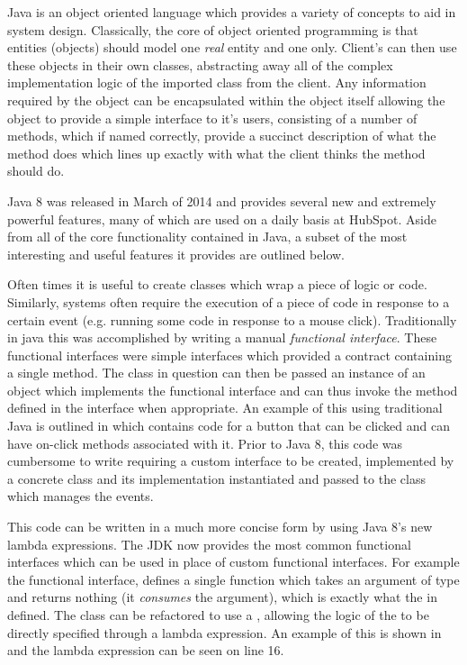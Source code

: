Java is an object oriented language which provides a variety of concepts to aid in system design. Classically, the core of object oriented programming is that entities (objects) should model one \textit{real} entity and one only. Client's can then use these objects in their own classes, abstracting away all of the complex implementation logic of the imported class from the client. Any information required by the object can be encapsulated within the object itself allowing the object to provide a simple interface to it's users, consisting of a number of methods, which if named correctly, provide a succinct description of what the method does which lines up exactly with what the client thinks the method should do.

Java 8 was released in March of 2014 and provides several new and extremely powerful features, many of which are used on a daily basis at HubSpot. Aside from all of the core functionality contained in Java, a subset of the most interesting and useful features it provides are outlined below.

Often times it is useful to create classes which wrap a piece of logic or code. Similarly, systems often require the execution of a piece of code in response to a certain event (e.g. running some code in response to a mouse click). Traditionally in java this was accomplished by writing a manual \textit{functional interface}. These functional interfaces were simple interfaces which provided a contract containing a single method. The class in question can then be passed an instance of an object which implements the functional interface and can thus invoke the method defined in the interface when appropriate. An example of this using traditional Java is outlined in  which contains code for a button that can be clicked and can have on-click methods associated with it. Prior to Java 8, this code was cumbersome to write requiring a custom interface to be created, implemented by a concrete class and its implementation instantiated and passed to the class which manages the events. 



This code can be written in a much more concise form by using Java 8's new lambda expressions. The JDK now provides the most common functional interfaces which can be used in place of custom functional interfaces. For example the  functional interface, defines a single  function which takes an argument of type  and returns nothing (it \textit{consumes} the argument), which is exactly what the  in  defined. The  class can be refactored to use a , allowing the logic of the  to be directly specified through a lambda expression. An example of this is shown in  and the lambda expression can be seen on line 16.
\vfill

